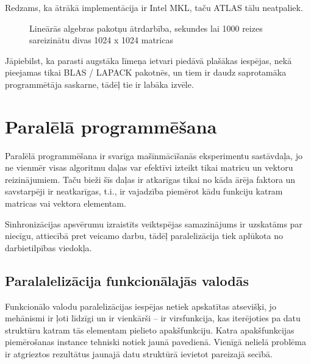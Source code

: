 \documentclass{ludis}
\begin{document}
Redzams, ka ātrākā implementācija ir Intel MKL, taču ATLAS tālu neatpaliek.
\begin{figure}[!hta]
  \centering
  \caption[Lineārās algebras pakotņu ātrdarbība]{Lineārās algebras pakotņu ātrdarbība, sekundes lai 1000 reizes sareizinātu divas 1024 x 1024 matricas\footnotemark}
  \label{fig:blas_performance}
\end{figure}
Jāpiebilst, ka parasti augstāka līmeņa ietvari piedāvā plašākas iespējas, nekā pieejamas tikai BLAS / LAPACK pakotnēs, un tiem ir daudz saprotamāka programmētāja saskarne, tādēļ tie ir labāka izvēle.

\section{Paralēlā programmēšana}
Paralēlā programmēšana ir svarīga mašīnmācīšanās eksperimentu sastāvdaļa, jo ne vienmēr visas algoritmu daļas var efektīvi izteikt tikai matricu un vektoru reizinājumiem. Taču bieži šīs daļas ir atkarīgas tikai no kāda ārēja faktora un savstarpēji ir neatkarīgas, t.i., ir vajadzība piemērot kādu funkciju katram matricas vai vektora elementam.

Sinhronizācijas apsvērumu izraistīts veiktspējas samazinājums ir uzskatāms par niecīgu, attiecībā pret veicamo darbu, tādēļ paralelizācija tiek aplūkota no darbietilpības viedokļa.

\subsection{Paralalelizācija funkcionālajās valodās}
Funkcionālo valodu paralelizācijas iespējas netiek apskatītas atsevišķi, jo mehānismi ir ļoti līdzīgi un ir vienkārši -- ir virsfunkcija, kas iterējoties pa datu struktūru katram tās elementam pielieto apakšfunkciju. Katra apakšfunkcijas piemērošanas instance tehniski notiek jaunā pavedienā. Vienīgā nelielā problēma ir atgrieztos rezultātus jaunajā datu struktūrā ievietot pareizajā secībā.
\end{document}
